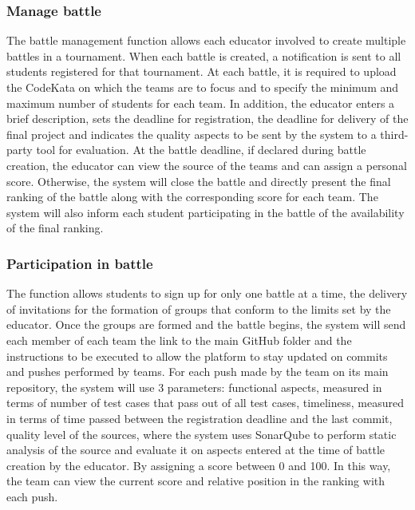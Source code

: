 \subsubsection{Manage battle}
The battle management function allows each educator involved to create multiple battles in a tournament.
\newline
When each battle is created, a notification is sent to all students registered for that tournament. At each battle, it is required to upload the CodeKata on which the teams are to focus and to specify the minimum and maximum number of students for each team. In addition, the educator enters a brief description, sets the deadline for registration, the deadline for delivery of the final project and indicates the quality aspects to be sent by the system to a third-party tool for evaluation.
\newline
At the battle deadline, if declared during battle creation, the educator can view the source of the teams and can assign a personal score. Otherwise, the system will close the battle and directly present the final ranking of the battle along with the corresponding score for each team. The system will also inform each student participating in the battle of the availability of the final ranking.

\subsubsection{Participation in battle}
The function allows students to sign up for only one battle at a time, the delivery of invitations for the formation of groups that conform to the limits set by the educator. Once the groups are formed and the battle begins, the system will send each member of each team the link to the main GitHub folder and the instructions to be executed to allow the platform to stay updated on commits and pushes performed by teams. For each push made by the team on its main repository, the system will use 3 parameters: functional aspects, measured in terms of number of test cases that pass out of all test cases,
timeliness, measured in terms of time passed between the registration deadline and the last commit,
quality level of the sources, where the system uses SonarQube to perform static analysis of the source and evaluate it on aspects entered at the time of battle creation by the educator. By assigning a score between 0 and 100. In this way, the team can view the current score and relative position in the ranking with each push.



